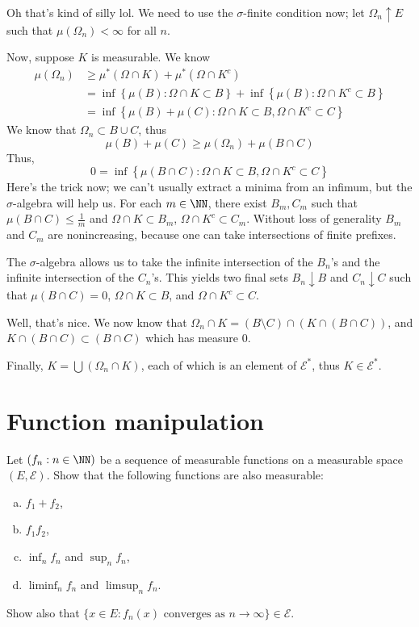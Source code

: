\documentclass[11pt, headheight=30pt]{scrartcl}
\begin{document}
\begin{psec*}
    Oh that's kind of silly lol. We need to use the $\sigma$-finite condition
    now; let $\Omega_n\uparrow E$ such that $\mu(\Omega_n) < \infty$ for all $n$.

    Now, suppose $K$ is measurable. We know
    \begin{align*}
        \mu(\Omega_n) &\geq \mu^*(\Omega\cap K)  + \mu^*(\Omega \cap K^c)\\
        &= \inf\left\{\mu(B): \Omega\cap K\subset B\right\} + \inf\left\{\mu(B): \Omega\cap K^c\subset B\right\}\\
        &= \inf\left\{\mu(B) + \mu(C): \Omega\cap K\subset B, \Omega\cap K^c\subset C\right\}
    \end{align*}
    We know that $\Omega_n\subset B\cup C$, thus
    \[
        \mu(B) + \mu(C) \geq \mu(\Omega_n) + \mu(B\cap C)    
    \]
    Thus,
    \[
        0 = \inf\left\{\mu(B\cap C): \Omega\cap K\subset B, \Omega\cap K^c\subset C\right\}
    \]
    Here's the trick now; we can't usually extract a minima from an
    infimum, but the $\sigma$-algebra will help us. For each $m\in \NN$,
    there exist $B_m, C_m$ such that $\mu(B\cap C)\leq \frac{1}{m}$
    and $\Omega\cap K\subset B_m$, $\Omega\cap K^c\subset C_m$.
    Without loss of generality $B_m$ and $C_m$ are nonincreasing,
    because one can take intersections of finite prefixes.

    The $\sigma$-algebra allows us to take the infinite intersection
    of the $B_n$'s and the infinite intersection of the $C_n$'s.
    This yields two final sets $B_n\downarrow B$ and $C_n\downarrow C$
    such that $\mu(B\cap C) = 0$, $\Omega\cap K\subset B$, and $\Omega\cap K^c\subset C$.

    Well, that's nice. We now know that $\Omega_n \cap K = (B\setminus C)\cap (K\cap (B\cap C))$,
    and $K\cap (B\cap C)\subset (B\cap C)$ which has measure $0$.

    Finally, $K = \bigcup \left(\Omega_n \cap K\right)$, each of which is an element of
    $\mathcal{E}^*$, thus $K\in \mathcal{E}^*$.
\end{psec*}

\section{Function manipulation}

\begin{prob}[Preliminaries]
    Let $(f_n: n \in \NN)$ be a sequence of measurable functions on a measurable
    space $(E, \mathcal{E})$. Show that the following functions are also measurable:
    \begin{enumerate}[(a)]
        \item $f_1 + f_2$,
        \item $f_1 f_2$,
        \item $\inf_n f_n$ and $\sup_n f_n$,
        \item $\liminf_n f_n$ and $\limsup_n f_n$.
    \end{enumerate}
    Show also that $\{x \in E : f_n(x) \text{ converges as } n \to \infty\} \in \mathcal{E}$.
\end{prob}
\end{document}

